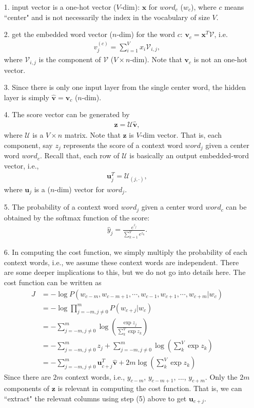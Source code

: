 \documentclass[10pt,letterpaper]{article}
\begin{document}
\begin{enumerate}
	\item[1.] input vector is a one-hot vector ($V$-dim): $\mathbf{x}$ for $word_c$ ($w_c$), where $c$ means ``center" and is not necessarily the index in the vocabulary of size $V$.
	\item[2.] get the embedded word vector ($n$-dim) for the word $c$: $\mathbf{v}_c = \mathbf{x}^T \mathcal{V}$, i.e.
	\begin{align}
	v^{(c)}_j = \sum^V_{i=1} x_i \mathcal{V}_{i, j},
	\end{align}
	where $\mathcal{V}_{i, j}$ is the component of $\mathcal{V}$ ($V\times n$-dim). Note that $\mathbf{v}_c$ is not an one-hot vector.
	\item[3.] Since there is only one input layer from the single center word, the hidden layer is simply $\mathbf{\hat{v}} = \mathbf{v}_c$ ($n$-dim).
	\item[4.] The score vector can be generated by
	\begin{align}
	\mathbf{z} = \mathcal{U}\mathbf{\hat{v}},
	\end{align}
	where $\mathcal{U}$ is a $V \times n$ matrix. Note that $\mathbf{z}$ is $V$-dim vector. That is, each component, say $z_j$ represents the score of a context word $word_j$ given a center word $word_c$. Recall that, each row of $\mathcal{U}$ is basically an output embedded-word vector, i.e.,
	\begin{align}
	\mathbf{u}_j^T = \mathcal{U}_{(j,\cdot)},
	\end{align}
	where $\mathbf{u}_j$ is a ($n$-dim) vector for $word_j$.
	\item[5.] The probability of a context word $word_j$ given a center word $word_c$ can be obtained by the softmax function of the score:
	\begin{align}
	\hat{y}_j = \frac{e^{z_j}}{\sum^V_{k=1} e^{z_k} }.
	\end{align}
	\item[6.] In computing the cost function, we simply multiply the probability of each context words, i.e., we assume these context words are independent. There are some deeper implications to this, but we do not go into details here. The cost function can be written as
	\begin{align}
	J &= -\log P(w_{c-m},w_{c-m+1},\cdots,w_{c-1},w_{c+1},\cdots,w_{c+m} | w_c) \\
	&= - \log \prod_{j=-m,j\neq 0}^{m} P(w_{c+j}| w_c) \\
	&= -\sum^m_{j=-m,j\neq 0} \log \left(\frac{\exp{z_j}}{\sum_k^V \exp{z_k}}\right) \\
	&= -\sum^m_{j=-m,j\neq 0} z_j + \sum^m_{j=-m,j\neq 0}\log \left(\sum_k^V \exp{z_k}\right) \\
	&= -\sum^m_{j=-m,j\neq 0} \mathbf{u}_{c+j}^T \mathbf{\hat{v}} + 2m \log \left(\sum_k^V \exp{z_k}\right)
	\end{align}
	Since there are $2m$ context words, i.e., $y_{c-m}$, $y_{c-m+1}$, ..., $y_{c+m}$. Only the $2m$ components of $\mathbf{z}$ is relevant in computing the cost function. That is, we can ``extract" the relevant columns using step (5) above to get $\mathbf{u}_{c+j}$.
\end{enumerate}
\end{document}
